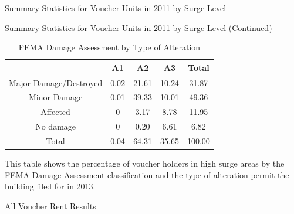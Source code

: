 \documentclass[12pt]{article}
\begin{document}
{{{{{{\begin{table}[!htbp]
\centering
\caption{\label{tab:vouchstats}Summary Statistics for Voucher Units in 2011 by Surge Level}

\end{table}



\begin{table}[!htbp]
\centering
\caption{\label{tab:vouchstats2}Summary Statistics for Voucher Units in 2011 by Surge Level (Continued)}

\end{table}

\begin{table}[!htbp]
\begin{center}
\begin{threeparttable}
\caption{\label{tab:femadamage} FEMA Damage Assessment by Type of Alteration}
\begin{tabular}{||c c c c c||} 
 \toprule
    & A1 & A2 & A3 & Total \\ [0.5ex] 
\midrule
 Major Damage/Destroyed & 0.02  & 21.61 &  10.24 &   31.87 \\
 Minor Damage & 0.01 &  39.33 &  10.01 &   49.36 \\
 Affected   &0  &   3.17  &  8.78 &   11.95 \\
 No damage &0  &      0.20  &  6.61   &  6.82 \\
  Total    & 0.04  & 64.31 &  35.65  & 100.00 \\
 \hline
\end{tabular}
    \begin{tablenotes}
      \small
      \item This table shows the percentage of voucher holders in high surge areas by the FEMA Damage Assessment classification and the type of alteration permit the building filed for in 2013.
    \end{tablenotes}
  \end{threeparttable}
\end{center}
\end{table}



\begin{table}[!htbp]
\centering
\caption{\label{tab:allvouchrents}All Voucher Rent Results}

\end{table}


}}}}}}
\end{document}
